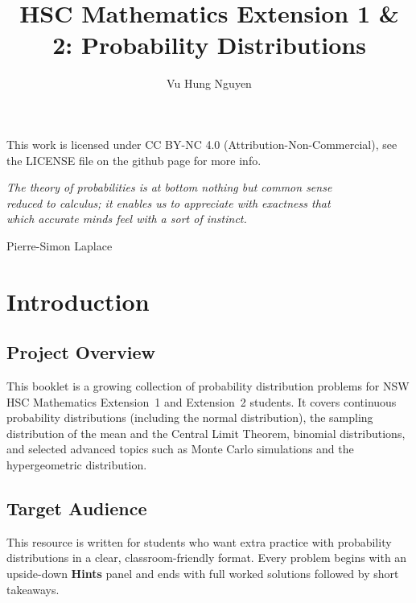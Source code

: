 \documentclass[12pt]{article}
\author{Vu Hung Nguyen}
\title{HSC Mathematics Extension 1 \& 2: Probability Distributions}
\date{}
\begin{document}


\newpage


\begingroup\small\noindent This work is licensed under CC BY-NC 4.0 (Attribution-Non-Commercial), see the LICENSE file on the github page for more info.\par\endgroup

\newpage

\thispagestyle{empty}
\vspace*{\fill}
\begin{center}
\itshape
The theory of probabilities is at bottom nothing but common sense\\
reduced to calculus; it enables us to appreciate with exactness that\\
which accurate minds feel with a sort of instinct.

\vspace{1em}
\normalfont Pierre-Simon Laplace
\end{center}
\vspace*{\fill}

\newpage

\tableofcontents
\newpage

\section{Introduction}

\subsection{Project Overview}
This booklet is a growing collection of probability distribution problems for NSW HSC Mathematics Extension~1 and Extension~2 students. It covers continuous probability distributions (including the normal distribution), the sampling distribution of the mean and the Central Limit Theorem, binomial distributions, and selected advanced topics such as Monte Carlo simulations and the hypergeometric distribution.

\subsection{Target Audience}
This resource is written for students who want extra practice with probability distributions in a clear, classroom-friendly format. Every problem begins with an upside-down \textbf{Hints} panel and ends with full worked solutions followed by short takeaways.
\end{document}
